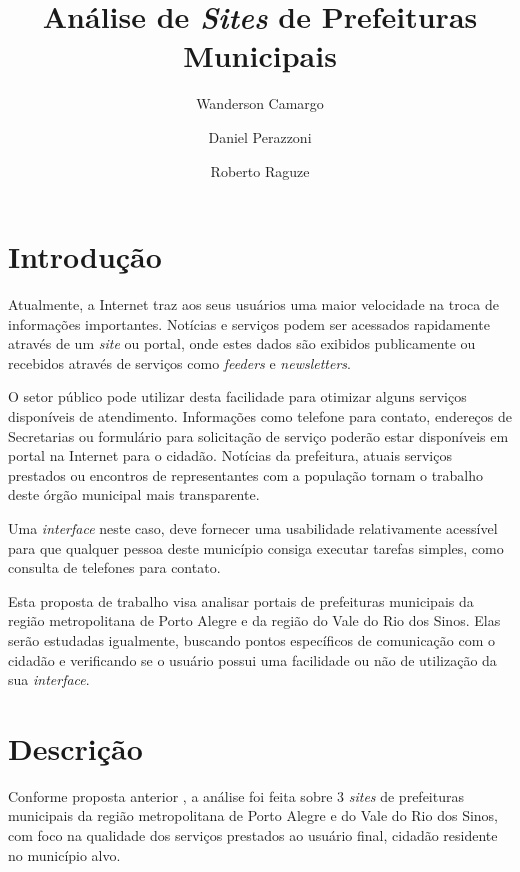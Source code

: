 \documentclass{article}
\title{Análise de \textit{Sites} de Prefeituras Municipais}
\author{Wanderson Camargo\inst{1}\and{}Daniel Perazzoni\inst{1}\and{}Roberto
Raguze\inst{1}}
\begin{document}
\maketitle{}

\section{Introdução}
\label{sec:introducao}

Atualmente, a Internet traz aos seus usuários uma maior velocidade na troca de
informações importantes. Notícias e serviços podem ser acessados rapidamente
através de um \textit{site} ou portal, onde estes dados são exibidos
publicamente ou recebidos através de serviços como \textit{feeders} e
\textit{newsletters}.

O setor público pode utilizar desta facilidade para otimizar alguns serviços
disponíveis de atendimento. Informações como telefone para contato, endereços de
Secretarias ou formulário para solicitação de serviço poderão estar disponíveis
em portal na Internet para o cidadão. Notícias da prefeitura, atuais serviços
prestados ou encontros de representantes com a população tornam o trabalho deste
órgão municipal mais transparente.

Uma \textit{interface} neste caso, deve fornecer uma usabilidade relativamente
acessível para que qualquer pessoa deste município consiga executar tarefas
simples, como consulta de telefones para contato.

Esta proposta de trabalho visa analisar portais de prefeituras municipais da
região metropolitana de Porto Alegre e da região do Vale do Rio dos Sinos. Elas
serão estudadas igualmente, buscando pontos específicos de comunicação com o
cidadão e verificando se o usuário possui uma facilidade ou não de utilização da
sua \textit{interface}.

\section{Descrição}
\label{sec:descricao}

Conforme proposta anterior \cite{camargo2010}, a análise foi feita sobre 3
\textit{sites} de prefeituras municipais da região metropolitana de Porto Alegre
e do Vale do Rio dos Sinos, com foco na qualidade dos serviços prestados ao
usuário final, cidadão residente no município alvo.
\end{document}

